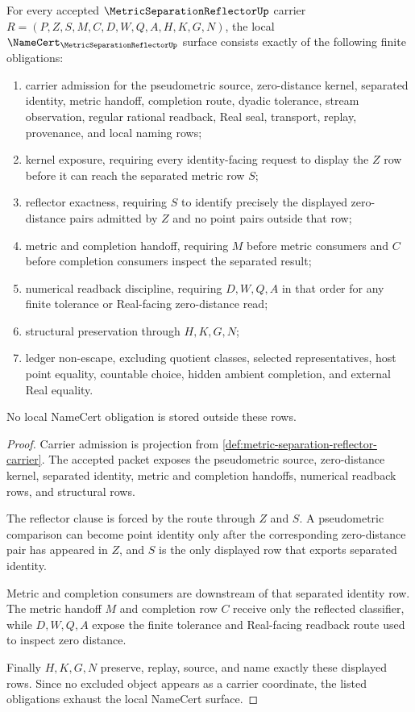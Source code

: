 \begin{theorem}
\label{thm:metric-separation-reflector-namecert-obligations}
For every accepted $\MetricSeparationReflectorUp$ carrier
$R=(P,Z,S,M,C,D,W,Q,A,H,K,G,N)$, the local
$\NameCert_{\MetricSeparationReflectorUp}$ surface consists exactly of the
following finite obligations:
\begin{enumerate}
\item carrier admission for the pseudometric source, zero-distance kernel,
separated identity, metric handoff, completion route, dyadic tolerance,
stream observation, regular rational readback, Real seal, transport, replay,
provenance, and local naming rows;
\item kernel exposure, requiring every identity-facing request to display the
$Z$ row before it can reach the separated metric row $S$;
\item reflector exactness, requiring $S$ to identify precisely the displayed
zero-distance pairs admitted by $Z$ and no point pairs outside that row;
\item metric and completion handoff, requiring $M$ before metric consumers and
$C$ before completion consumers inspect the separated result;
\item numerical readback discipline, requiring $D,W,Q,A$ in that order for
any finite tolerance or Real-facing zero-distance read;
\item structural preservation through $H,K,G,N$;
\item ledger non-escape, excluding quotient classes, selected representatives,
host point equality, countable choice, hidden ambient completion, and external
Real equality.
\end{enumerate}
No local NameCert obligation is stored outside these rows.
\end{theorem}
\begin{proof}
Carrier admission is projection from
\autoref{def:metric-separation-reflector-carrier}. The accepted packet
exposes the pseudometric source, zero-distance kernel, separated identity,
metric and completion handoffs, numerical readback rows, and structural rows.

The reflector clause is forced by the route through $Z$ and $S$. A
pseudometric comparison can become point identity only after the corresponding
zero-distance pair has appeared in $Z$, and $S$ is the only displayed row that
exports separated identity.

Metric and completion consumers are downstream of that separated identity
row. The metric handoff $M$ and completion row $C$ receive only the reflected
classifier, while $D,W,Q,A$ expose the finite tolerance and Real-facing
readback route used to inspect zero distance.

Finally $H,K,G,N$ preserve, replay, source, and name exactly these displayed
rows. Since no excluded object appears as a carrier coordinate, the listed
obligations exhaust the local NameCert surface.
\end{proof}

